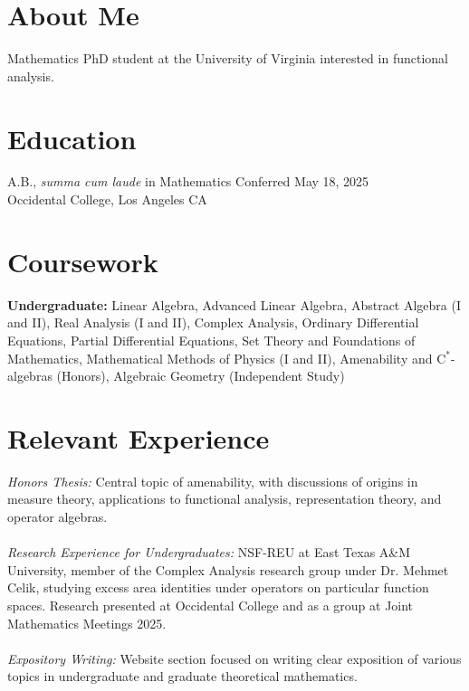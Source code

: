 \documentclass[margin, 12pt]{res} %
\begin{document}
\begin{resume}

\section{\sc About Me}
Mathematics PhD student at the University of Virginia interested in functional analysis.

\section{\sc Education}

A.B., \textsl{summa cum laude} in Mathematics \hfill Conferred May 18, 2025 \\
Occidental College, Los Angeles CA
\section{\sc Coursework}
\textbf{Undergraduate:} Linear Algebra, Advanced Linear Algebra, Abstract Algebra (I and II), Real Analysis (I and II), Complex Analysis, Ordinary Differential Equations, Partial Differential Equations, Set Theory and Foundations of Mathematics, Mathematical Methods of Physics (I and II), Amenability and $\mathrm{C}^{\ast}$-algebras (Honors), Algebraic Geometry (Independent Study)
\section{\sc Relevant Experience}
{\sl Honors Thesis:} Central topic of amenability, with discussions of origins in measure theory, applications to functional analysis, representation theory, and operator algebras.\\
\vspace{4pt}\\
{\sl Research Experience for Undergraduates:} NSF-REU at East Texas A\&M University, member of the Complex Analysis research group under Dr. Mehmet Celik, studying excess area identities under operators on particular function spaces. Research presented at Occidental College and as a group at Joint Mathematics Meetings 2025.\\
\vspace{4pt}\\
{\sl Expository Writing:} Website section focused on writing clear exposition of various topics in undergraduate and graduate theoretical mathematics.

\end{resume}
\end{document}
